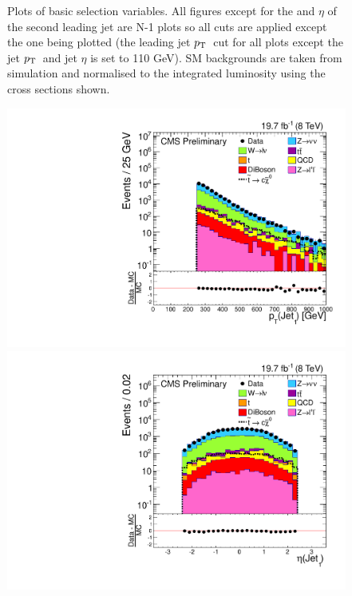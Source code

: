 \begin{figure}
\begin{center}
  \caption{Plots of basic selection variables.  All figures except for the \pt and $\eta$ of the second leading jet are N-1 plots so all cuts are applied except the one being plotted (the leading jet $p_{\text{T}}\,$ cut for all plots except the jet $p_{\text{T}}\,$ and jet $\eta$ is set to 110 GeV). \ac{SM} backgrounds are taken from simulation and normalised to the integrated luminosity using the cross sections shown.
  \label{fig:n-1plots}}
  \end{center}
\end{figure}

\begin{figure}%
  \begin{center}
  \includegraphics[scale=0.32]     {Figures/sus13009/cut/Jet1Pt.pdf}
  \includegraphics[scale=0.32]     {Figures/sus13009/cut/Jet1Eta.pdf}

\end{center}
\end{figure}
